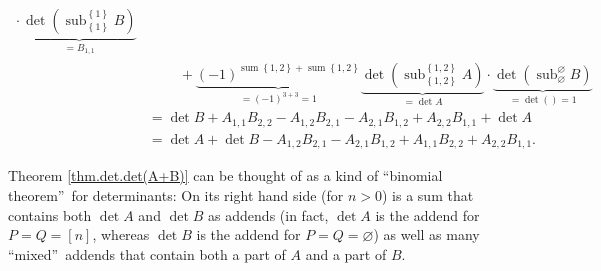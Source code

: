 \begin{example}
\begin{align*}
{}\cdot\underbrace{\det\left(  \operatorname*{sub}\nolimits_{\left\{
1\right\}  }^{\left\{  1\right\}  }B\right)  }_{=B_{1,1}}\\
&  \ \ \ \ \ \ \ \ \ \ +\underbrace{\left(  -1\right)  ^{\operatorname*{sum}%
\left\{  1,2\right\}  +\operatorname*{sum}\left\{  1,2\right\}  }}_{=\left(
-1\right)  ^{3+3}=1}\underbrace{\det\left(  \operatorname*{sub}%
\nolimits_{\left\{  1,2\right\}  }^{\left\{  1,2\right\}  }A\right)  }_{=\det
A}\cdot\underbrace{\det\left(  \operatorname*{sub}\nolimits_{\varnothing
}^{\varnothing}B\right)  }_{=\det\left(  {}\right)  =1}\\
&  =\det B+A_{1,1}B_{2,2}-A_{1,2}B_{2,1}-A_{2,1}B_{1,2}+A_{2,2}B_{1,1}+\det
A\\
&  =\det A+\det B-A_{1,2}B_{2,1}-A_{2,1}B_{1,2}+A_{1,1}B_{2,2}+A_{2,2}B_{1,1}.
\end{align*}

\end{example}

Theorem \ref{thm.det.det(A+B)} can be thought of as a kind of
\textquotedblleft binomial theorem\textquotedblright\ for determinants: On its
right hand side (for $n>0$) is a sum that contains both $\det A$ and $\det B$
as addends (in fact, $\det A$ is the addend for $P=Q=\left[  n\right]  $,
whereas $\det B$ is the addend for $P=Q=\varnothing$) as well as many
\textquotedblleft mixed\textquotedblright\ addends that contain both a part of
$A$ and a part of $B$.

